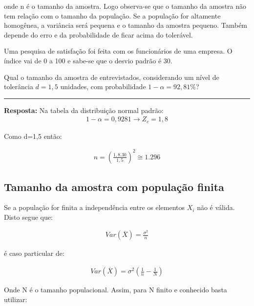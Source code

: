 \documentclass[
  letterpaper,
  DIV=11,
  numbers=noendperiod]{scrartcl}
\begin{document}
onde n é o tamanho da amostra. Logo observa-se que o tamanho da amostra
não tem relação com o tamanho da população. Se a população for altamente
homogênea, a variância será pequena e o tamanho da amostra pequeno.
Também depende do erro e da probabilidade de ficar acima do tolerável.

\begin{exemplo}

Uma pesquisa de satisfação foi feita com os funcionários de uma empresa.
O índice vai de 0 a 100 e sabe-se que o desvio padrão é 30.

Qual o tamanho da amostra de entrevistados, considerando um nível de
tolerância \(d=1,5\) unidades, com probabilidade \(1-\alpha=92,81\%\)?

\begin{center}\rule{0.5\linewidth}{0.5pt}\end{center}

\textbf{Resposta:} Na tabela da distribuição normal padrão:
\[\begin{array}{ccc}
1 -\alpha = 0,9281 \rightarrow Z_c=1,8
\end{array}\]

Como d=1,5 então:

\[\begin{array}{ccc}
n=(\frac{1,8 . 30}{1,5})^{2}\cong 1.296 
\end{array}\]

\end{exemplo}

\subsection{Tamanho da amostra com população
finita}\label{tamanho-da-amostra-com-populauxe7uxe3o-finita}

Se a população for finita a independência entre os elementos \(X_i\) não
é válida. Disto segue que:

\[\begin{array}{ccc}
Var(\overline{X}) = \frac{\sigma^{2}}{n}
\end{array}\]

é caso particular de:

\[\begin{array}{ccc}
Var(\overline{X}) = \sigma^{2}(\frac{1}{n}-\frac{1}{N})
\end{array}\]

Onde N é o tamanho populacional. Assim, para N finito e conhecido basta
utilizar:
\end{document}
